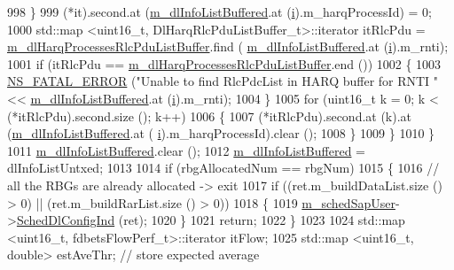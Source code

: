 \begin{DoxyCode}
998             \}
999           (*it).second.at (\hyperlink{classns3_1_1FdBetFfMacScheduler_ae987d949dcc264154314730346f4a7a8}{m\_dlInfoListBuffered}.at (\hyperlink{bernuolliDistribution_8m_a6f6ccfcf58b31cb6412107d9d5281426}{i}).m\_harqProcessId) = 0;
1000           std::map <uint16\_t, DlHarqRlcPduListBuffer\_t>::iterator itRlcPdu =  
      \hyperlink{classns3_1_1FdBetFfMacScheduler_ace3cb887417444023ca2f39d5de6a7cf}{m\_dlHarqProcessesRlcPduListBuffer}.find (
      \hyperlink{classns3_1_1FdBetFfMacScheduler_ae987d949dcc264154314730346f4a7a8}{m\_dlInfoListBuffered}.at (\hyperlink{bernuolliDistribution_8m_a6f6ccfcf58b31cb6412107d9d5281426}{i}).m\_rnti);
1001           \textcolor{keywordflow}{if} (itRlcPdu == \hyperlink{classns3_1_1FdBetFfMacScheduler_ace3cb887417444023ca2f39d5de6a7cf}{m\_dlHarqProcessesRlcPduListBuffer}.end ())
1002             \{
1003               \hyperlink{group__fatal_ga5131d5e3f75d7d4cbfd706ac456fdc85}{NS\_FATAL\_ERROR} (\textcolor{stringliteral}{"Unable to find RlcPdcList in HARQ buffer for RNTI "} << 
      \hyperlink{classns3_1_1FdBetFfMacScheduler_ae987d949dcc264154314730346f4a7a8}{m\_dlInfoListBuffered}.at (\hyperlink{bernuolliDistribution_8m_a6f6ccfcf58b31cb6412107d9d5281426}{i}).m\_rnti);
1004             \}
1005           \textcolor{keywordflow}{for} (uint16\_t k = 0; k < (*itRlcPdu).second.size (); k++)
1006             \{
1007               (*itRlcPdu).second.at (k).at (\hyperlink{classns3_1_1FdBetFfMacScheduler_ae987d949dcc264154314730346f4a7a8}{m\_dlInfoListBuffered}.at (
      \hyperlink{bernuolliDistribution_8m_a6f6ccfcf58b31cb6412107d9d5281426}{i}).m\_harqProcessId).clear ();
1008             \}
1009         \}
1010     \}
1011   \hyperlink{classns3_1_1FdBetFfMacScheduler_ae987d949dcc264154314730346f4a7a8}{m\_dlInfoListBuffered}.clear ();
1012   \hyperlink{classns3_1_1FdBetFfMacScheduler_ae987d949dcc264154314730346f4a7a8}{m\_dlInfoListBuffered} = dlInfoListUntxed;
1013 
1014   \textcolor{keywordflow}{if} (rbgAllocatedNum == rbgNum)
1015     \{
1016       \textcolor{comment}{// all the RBGs are already allocated -> exit}
1017       \textcolor{keywordflow}{if} ((ret.m\_buildDataList.size () > 0) || (ret.m\_buildRarList.size () > 0))
1018         \{
1019           \hyperlink{classns3_1_1FdBetFfMacScheduler_af2eac2234cc5c2b3d9999f9ec66911d3}{m\_schedSapUser}->\hyperlink{classns3_1_1FfMacSchedSapUser_a28f8484af5a32a45ee6c0e51770d83f7}{SchedDlConfigInd} (ret);
1020         \}
1021       \textcolor{keywordflow}{return};
1022     \}
1023 
1024   std::map <uint16\_t, fdbetsFlowPerf\_t>::iterator itFlow;
1025   std::map <uint16\_t, double> estAveThr;                                \textcolor{comment}{// store expected average
}
\end{DoxyCode}
